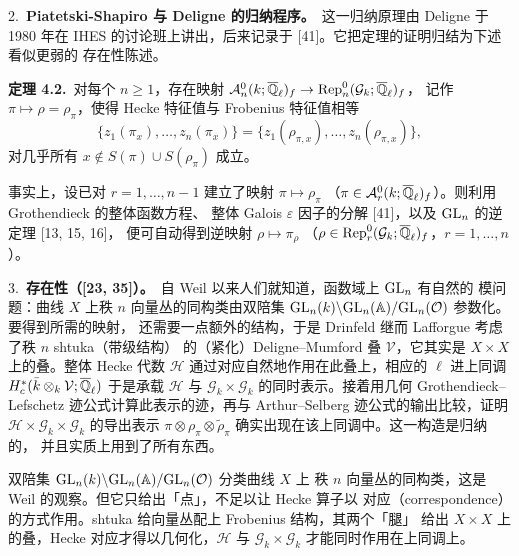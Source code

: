 2.~\textbf{Piatetski-Shapiro 与 Deligne 的归纳程序。}\ 这一归纳原理由 Deligne 于
1980 年在 IHES 的讨论班上讲出，后来记录于 [41]。它把定理的证明归结为下述看似更弱的
存在性陈述。

\par\medskip\noindent\textbf{定理 4.2.}\ 对每个 $n\ge1$，存在映射
$\mathcal{A}_n^0(k;\overline{\mathbb{Q}}_\ell)_f\to\operatorname{Rep}_n^0(\mathcal{G}_k;\overline{\mathbb{Q}}_\ell)_f$，
记作 $\pi\mapsto\rho=\rho_\pi$，使得 Hecke 特征值与 Frobenius 特征值相等
\[
  \{z_1(\pi_x),\dots,z_n(\pi_x)\}
  =\{z_1(\rho_{\pi,x}),\dots,z_n(\rho_{\pi,x})\},
\]
对几乎所有 $x\notin S(\pi)\cup S(\rho_\pi)$ 成立。
\par\medskip

事实上，设已对 $r=1,\dots,n-1$ 建立了映射 $\pi\mapsto\rho_\pi$
（$\pi\in\mathcal{A}_r^0(k;\overline{\mathbb{Q}}_\ell)_f$）。则利用 Grothendieck 的整体函数方程、
整体 Galois $\varepsilon$ 因子的分解 [41]，以及 $\mathrm{GL}_n$ 的逆定理 [13, 15, 16]，
便可自动得到逆映射 $\rho\mapsto\pi_\rho$
（$\rho\in\operatorname{Rep}_r^0(\mathcal{G}_k;\overline{\mathbb{Q}}_\ell)_f$，$r=1,\dots,n$）。

3.~\textbf{存在性（[23, 35]）。}\ 自 Weil 以来人们就知道，函数域上 $\mathrm{GL}_n$ 有自然的
模问题：曲线 $X$ 上秩 $n$ 向量丛的同构类由双陪集
$\mathrm{GL}_n(k)\backslash\mathrm{GL}_n(\mathbb{A})/\mathrm{GL}_n(\mathcal{O})$ 参数化。要得到所需的映射，
还需要一点额外的结构，于是 Drinfeld 继而 Lafforgue 考虑了秩 $n$ shtuka（带级结构）
的（紧化）Deligne--Mumford 叠 $\mathcal{V}$，它其实是 $X\times X$ 上的叠。整体
Hecke 代数 $\mathcal{H}$ 通过对应自然地作用在此叠上，相应的 $\ell$ 进上同调
$H^*_c(\bar k\otimes_k\mathcal{V};\overline{\mathbb{Q}}_\ell)$ 于是承载 $\mathcal{H}$ 与
$\mathcal{G}_k\times\mathcal{G}_k$ 的同时表示。接着用几何 Grothendieck--Lefschetz
迹公式计算此表示的迹，再与 Arthur--Selberg 迹公式的输出比较，证明
$\mathcal{H}\times\mathcal{G}_k\times\mathcal{G}_k$ 的导出表示
$\pi\otimes\rho_\pi\otimes\tilde\rho_\pi$ 确实出现在该上同调中。这一构造是归纳的，
并且实质上用到了所有东西。
\begin{annote}
双陪集 $\mathrm{GL}_n(k)\backslash\mathrm{GL}_n(\mathbb{A})/\mathrm{GL}_n(\mathcal{O})$ 分类曲线 $X$ 上
秩 $n$ 向量丛的同构类，这是 Weil 的观察。但它只给出「点」，不足以让 Hecke 算子以
对应（correspondence）的方式作用。shtuka 给向量丛配上 Frobenius 结构，其两个「腿」
给出 $X\times X$ 上的叠，Hecke 对应才得以几何化，$\mathcal{H}$ 与
$\mathcal{G}_k\times\mathcal{G}_k$ 才能同时作用在上同调上。
\par{}
\end{annote}

